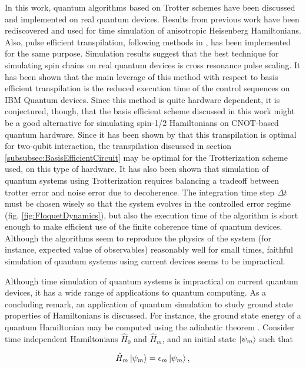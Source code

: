 In this work, quantum algorithms based on Trotter schemes have been discussed and implemented on real quantum devices. Results from previous work \cite{BellUniversalCartan} have been rediscovered and used for time simulation of anisotropic Heisenberg Hamiltonians. Also, pulse efficient transpilation, following methods in \cite{RXZPulseEfficient}, has been implemented for the same purpose. Simulation results suggest that the best technique for simulating spin chains on real quantum devices is cross resonance pulse scaling. It has been shown that the main leverage of this method with respect to basis efficient transpilation is the reduced execution time of the control sequences on IBM Quantum devices. Since this method is quite hardware dependent, it is conjectured, though, that the basis efficient scheme discussed in this work might be a good alternative for simulating spin-1/2 Hamiltonians on CNOT-based quantum hardware. Since it has been shown by \cite{BellUniversalCartan} that this transpilation is optimal for two-qubit interaction, the transpilation discussed in section \ref{subsubsec:BasisEfficientCircuit} may be optimal for the Trotterization scheme used, on this type of hardware. It has also been shown that simulation of quantum systems using Trotterization requires balancing a tradeoff between trotter error and noise error due to decoherence. The integration time step $\Delta t$ must be chosen wisely so that the system evolves in the controlled error regime (fig. \ref{fig:FloquetDynamics}), but also the execution time of the algorithm is short enough to make efficient use of the finite coherence time of quantum devices. Although the algorithms seem to reproduce the physics of the system (for instance, expected value of observables) reasonably well for small times, faithful simulation of quantum systems using current devices seems to be impractical.

Although time simulation of quantum systems is impractical on current quantum devices, it has a wide range of applications to quantum computing. As a concluding remark, an application of quantum simulation to study ground state properties of Hamiltonians is discussed. For instance, the ground state energy of a quantum Hamiltonian may be computed using the adiabatic theorem \cite{Sakurai}. Consider time independent Hamiltonians $\hat{H}_0$ and $\hat{H}_m$, and an initial state $\ket{\psi_m}$ such that

\begin{equation}
    \hat{H}_m \ket{\psi_m} = \epsilon_m \ket{\psi_m},
    \label{eq:MixerGroundState}
\end{equation}

